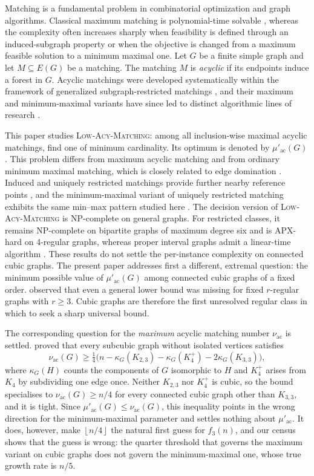 \documentclass[smallextended,natbib,nospthms]{svjour3}
\theoremstyle{definition}
\theoremstyle{remark}
\newcommand{\acnum}{\mu'_{\mathrm{ac}}}
\newcommand{\maxacnum}{\nu_{\mathrm{ac}}}
\newcommand{\LowAcy}{\textnormal{\textsc{Low-Acy-Matching}}}
\newcommand{\floor}[1]{\left\lfloor #1\right\rfloor}
\begin{document}
Matching is a fundamental problem in combinatorial optimization and graph
algorithms. Classical maximum matching is polynomial-time solvable
\cite{Edmonds1965,LovaszPlummer2009}, whereas the complexity often increases
sharply when feasibility is defined through an induced-subgraph property or
when the objective is changed from a maximum feasible solution to a minimum
maximal one. Let $G$ be a finite simple graph and let $M\subseteq E(G)$ be a
matching. The matching $M$ is \emph{acyclic} if its endpoints induce a forest
in $G$. Acyclic matchings were developed systematically within the framework
of generalized subgraph-restricted matchings \cite{Goddard2005}, and their
maximum and minimum-maximal variants have since led to distinct algorithmic
lines of research
\cite{Chaudhary2024,Chaudhary2025,Furst2019,Panda2023,Zehavi2025}.

This paper studies \LowAcy: among all inclusion-wise maximal acyclic matchings,
find one of minimum cardinality. Its optimum is denoted by $\acnum(G)$.
This problem differs from maximum acyclic matching and from ordinary minimum
maximal matching, which is closely related to edge domination
\cite{Yannakakis1980}. Induced and uniquely restricted matchings provide
further nearby reference points \cite{Cameron1989,Golumbic2001}, and the
minimum-maximal variant of uniquely restricted matching exhibits the same
min--max pattern studied here \cite{ChaudharyPanda2021}.
The decision version of \LowAcy{} is NP-complete on general graphs. For
restricted classes, it remains NP-complete on bipartite graphs of maximum
degree six and is APX-hard on 4-regular graphs, whereas proper interval graphs
admit a linear-time algorithm \cite{Chaudhary2024,Chaudhary2025}. These
results do not settle the per-instance complexity on connected cubic graphs.
The present paper addresses first a different, extremal question: the minimum
possible value of $\acnum(G)$ among connected cubic graphs of a fixed order.
\citet{Chaudhary2024} observed that even a general lower
bound was missing for fixed $r$-regular graphs with $r\geq 3$. Cubic graphs
are therefore the first unresolved regular class in which to seek a sharp
universal bound.

The corresponding question for the \emph{maximum} acyclic matching number
$\maxacnum$ is settled. \citet{FurstRautenbach2018}
proved that every subcubic graph without isolated vertices satisfies
\[
  \maxacnum(G)\geq
  \tfrac14\bigl(n-\kappa_G(K_{2,3})-\kappa_G(K_4^{+})-2\kappa_G(K_{3,3})\bigr),
\]
where $\kappa_G(H)$ counts the components of $G$ isomorphic to $H$ and
$K_4^{+}$ arises from $K_4$ by subdividing one edge once. Neither $K_{2,3}$
nor $K_4^{+}$ is cubic, so the bound specialises to $\maxacnum(G)\geq n/4$ for
every connected cubic graph other than $K_{3,3}$, and it is tight. Since
$\acnum(G)\leq\maxacnum(G)$, this inequality points in the wrong direction for
the minimum-maximal parameter and settles nothing about $\acnum$. It does,
however, make $\floor{n/4}$ the natural first guess for $f_3(n)$, and our
census shows that the guess is wrong: the quarter threshold that governs the
maximum variant on cubic graphs does not govern the minimum-maximal one, whose
true growth rate is $n/5$.
\end{document}
